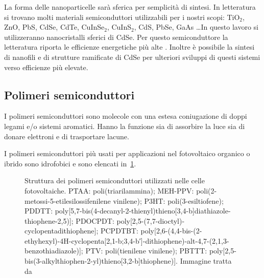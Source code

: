 La forma delle nanoparticelle sarà sferica per semplicità di sintesi. 
In letteratura si trovano molti materiali semiconduttori utilizzabili per i nostri scopi: TiO$_2$, ZnO, PbS, CdSe, CdTe, CuInSe$_2$, CuInS$_2$, CdS, PbSe, GaAs \ldots In questo lavoro si utilizzeranno nanocristalli sferici di CdSe. Per questo semiconduttore la letteratura riporta le efficienze energetiche più alte \cite{fv-all}. Inoltre è possibile la sintesi di nanofili e di strutture ramificate di CdSe per ulteriori sviluppi di questi sistemi verso efficienze più elevate. 
\subsection{Polimeri semiconduttori}

\label{subsec:polimeri_cond}
I polimeri semiconduttori sono molecole con una estesa coniugazione di doppi legami e/o sistemi aromatici. Hanno la funzione sia di assorbire la luce sia di donare elettroni e di trasportare lacune. 
        
I polimeri semiconduttori più usati per applicazioni nel fotovoltaico organico o ibrido sono idrofobici e sono elencati in~\ref{fig:polimericonduttori}.
\setlength{\captionmargin}{-.05\textwidth}
\begin{figure}
\caption{\footnotesize{Struttura dei polimeri semiconduttori utilizzati nelle celle fotovoltaiche. PTAA: poli(triarilammina); MEH-PPV: poli(2-metossi-5-etilesilossifenilene vinilene); P3HT: poli(3-esiltiofene); PDDTT: poly[5,7-bis(4-decanyl-2-thienyl)thieno[3,4-b]diathiazole-thiophene-2,5)]; PDOCPDT: poly[2,5-(7,7-dioctyl)-cyclopentadithiophene]; PCPDTBT: poly[2,6-(4,4-bis-(2-ethyhexyl)-4H-cyclopenta[2,1-b;3,4-b′]-dithiophene)-alt-4,7-(2,1,3-benzothiadiazole)]; PTV: poli(tienilene vinilene); PBTTT: poly[2,5-bis(3-alkylthiophen-2-yl)thieno[3,2-b]thiophene)].
Immagine tratta da \cite{fv-all}}
\label{fig:polimericonduttori}}
\end{figure}
        
